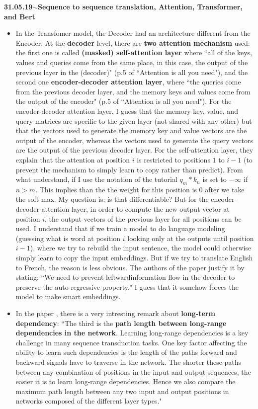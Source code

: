 \documentclass[11pt,a4paper]{article}
\newenvironment{loggentry}[2]%
{\noindent\textbf{#1}\hspace{1cm}$\mathbf{\sim}$\text{ }\textbf{#2}\\}{\vspace{0.5cm}}
\begin{document}
\begin{loggentry}{31.05.19}{Sequence to sequence translation, Attention, Transformer, and Bert}
\begin{itemize}
\item In the Transfomer model,  the Decoder had an architecture different from the Encoder. At the \textbf{decoder} level, there are \textbf{two attention mechanism} used: the first one is called \textbf{(masked) self-attention layer} where ``all of the keys, values and queries come from the same place, in this case, the output of the previous layer in the (decoder)" (p.5 of ``Attention is all you need"), and the second one \textbf{encoder-decoder attention layer}, where ``the queries come from the previous decoder layer, and the memory keys and values come from the output of the encoder" (p.5 of ``Attention is all you need"). For the encoder-decoder attention layer, I guess that the memory key, value, and query matrices are specific to the given layer (not shared with any other) but that the vectors used to generate the memory key and value vectors are the output of the encoder, whereas the vectors used to generate the query vectors are the output of the previous decoder layer. For the self-attention layer, they explain that the attention at position $i$ is restricted to positions $1$ to $i-1$ (to prevent the mechanism to simply learn to copy rather than predict). From what understand, if I use the notation of the tutorial $q_m * k_n$ is set to $-\infty$ if $n>m$. This implies than the the weight for this position is 0 after we take the soft-max. My question is: is that differentiable? But for the encoder-decoder attention layer,  in order to compute the new output vector at position $i$, the output vectors of the previous layer for all positions can be used. I understand that if we train a model to do language modeling (guessing what is word at position $i$ looking only at the outputs until position $i-1$), where we try to rebuild the input sentence, the model could otherwise simply learn to copy the input embeddings. But if we try to translate English to French, the reason is less obvious. The authors of the paper justify it by stating: ``We need to prevent leftwardinformation flow in the decoder to preserve the auto-regressive property." I guess that it somehow forces the model to make smart embeddings.
\item In the paper , there is a very intresting remark about \textbf{long-term dependency}:
``The third is the \textbf{path length between long-range dependencies in the network}. Learning long-range dependencies is a key challenge in many sequence transduction tasks. One key factor affecting the ability to learn such dependencies is the length of the paths forward and backward signals have to traverse in the network. The shorter these paths between any combination of positions in the input and output sequences, the easier it is to learn long-range dependencies. Hence we also compare the maximum path length between any two input and output positions in networks composed of the different layer types."

\end{itemize}
\end{loggentry}
\end{document}
